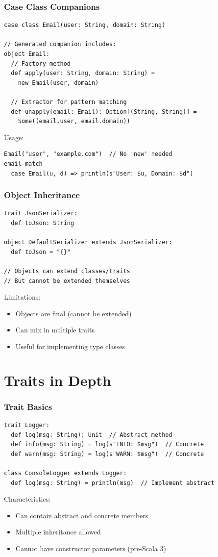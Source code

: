 \documentclass{beamer}
\begin{document}
\begin{frame}[fragile]
\frametitle{Case Class Companions}
\begin{lstlisting}[style=scala]
case class Email(user: String, domain: String)

// Generated companion includes:
object Email:
  // Factory method
  def apply(user: String, domain: String) = 
    new Email(user, domain)
    
  // Extractor for pattern matching
  def unapply(email: Email): Option[(String, String)] = 
    Some((email.user, email.domain))
\end{lstlisting}

Usage:
\begin{lstlisting}[style=scala]
Email("user", "example.com")  // No 'new' needed
email match
  case Email(u, d) => println(s"User: $u, Domain: $d")
\end{lstlisting}
\end{frame}

\begin{frame}[fragile]
\frametitle{Object Inheritance}
\begin{lstlisting}[style=scala]
trait JsonSerializer:
  def toJson: String

object DefaultSerializer extends JsonSerializer:
  def toJson = "{}"

// Objects can extend classes/traits
// But cannot be extended themselves
\end{lstlisting}

Limitations:
\begin{itemize}
\item Objects are final (cannot be extended)
\item Can mix in multiple traits
\item Useful for implementing type classes
\end{itemize}
\end{frame}

\section{Traits in Depth}
\begin{frame}[fragile]
\frametitle{Trait Basics}
\begin{lstlisting}[style=scala]
trait Logger:
  def log(msg: String): Unit  // Abstract method
  def info(msg: String) = log(s"INFO: $msg")  // Concrete
  def warn(msg: String) = log(s"WARN: $msg")  // Concrete

class ConsoleLogger extends Logger:
  def log(msg: String) = println(msg)  // Implement abstract
\end{lstlisting}

Characteristics:
\begin{itemize}
\item Can contain abstract and concrete members
\item Multiple inheritance allowed
\item Cannot have constructor parameters (pre-Scala 3)
\end{itemize}
\end{frame}
\end{document}
